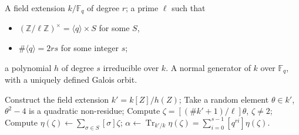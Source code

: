 \documentclass[12pt]{article}
\theoremstyle{plain}
\theoremstyle{definition}
\DeclareMathOperator{\trace}{Tr} %
\def\Z{\ensuremath{\mathbb{Z}}}
\def\F{\ensuremath{\mathbb{F}}}
\newcounter{algorithm}
\begin{document}
\begin{algorithm}
  \label{algorithm:rains-conic}
  \begin{algorithmic}[1]
    \REQUIRE A field extension $k/\F_q$ of degree $r$; a prime $\ell$
    such that
    \begin{itemize}
    \item $(\Z/\ell\Z)^\times = \langle q\rangle \times S$ for some $S$,
    \item $\#\langle q\rangle = 2rs$ for some integer $s$;
    \end{itemize}
    a polynomial $h$ of degree $s$ irreducible over $k$.
    \ENSURE A normal generator of $k$ over $\F_q$,
    with a uniquely defined Galois orbit.
    
    \STATE Construct the field extension $k'=k[Z]/h(Z)$;
    \REPEAT
    \REPEAT
    \STATE Take a random element $\theta\in k'$,
    \UNTIL\label{algorithm:rains-conic:sqtest} $\theta^2-4$ is a quadratic non-residue;
    \STATE\label{algorithm:rains-conic:power} Compute $\zeta=[(\#k'+1)/\ell]\theta$,
    \UNTIL $\zeta\ne2$;
    \STATE\label{algorithm:rains-conic:period} Compute $\eta(\zeta) \leftarrow \sum_{\sigma\in S}[\sigma]\zeta$;
    \RETURN\label{algorithm:rains-conic:trace} $\alpha \leftarrow \trace_{k'/k}\eta(\zeta) = \sum_{i=0}^{s-1}[q^{ri}]\eta(\zeta)$.
  \end{algorithmic}
\end{algorithm}
\end{document}
